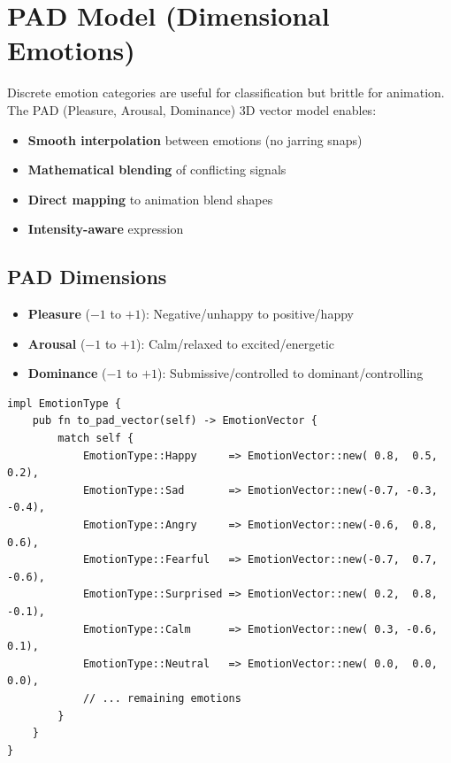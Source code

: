 \documentclass[11pt,letterpaper]{article}
\begin{document}
\section{PAD Model (Dimensional Emotions)}

\begin{keybox}
Discrete emotion categories are useful for classification but brittle for animation. The PAD (Pleasure, Arousal, Dominance) 3D vector model enables:
\begin{itemize}
  \item \textbf{Smooth interpolation} between emotions (no jarring snaps)
  \item \textbf{Mathematical blending} of conflicting signals
  \item \textbf{Direct mapping} to animation blend shapes
  \item \textbf{Intensity-aware} expression
\end{itemize}
\end{keybox}

\subsection{PAD Dimensions}

\begin{itemize}
  \item \textbf{Pleasure} ($-1$ to $+1$): Negative/unhappy to positive/happy
  \item \textbf{Arousal} ($-1$ to $+1$): Calm/relaxed to excited/energetic
  \item \textbf{Dominance} ($-1$ to $+1$): Submissive/controlled to dominant/controlling
\end{itemize}

\begin{lstlisting}[caption=Emotion to PAD Vector Mapping]
impl EmotionType {
    pub fn to_pad_vector(self) -> EmotionVector {
        match self {
            EmotionType::Happy     => EmotionVector::new( 0.8,  0.5,  0.2),
            EmotionType::Sad       => EmotionVector::new(-0.7, -0.3, -0.4),
            EmotionType::Angry     => EmotionVector::new(-0.6,  0.8,  0.6),
            EmotionType::Fearful   => EmotionVector::new(-0.7,  0.7, -0.6),
            EmotionType::Surprised => EmotionVector::new( 0.2,  0.8, -0.1),
            EmotionType::Calm      => EmotionVector::new( 0.3, -0.6,  0.1),
            EmotionType::Neutral   => EmotionVector::new( 0.0,  0.0,  0.0),
            // ... remaining emotions
        }
    }
}
\end{lstlisting}
\end{document}
